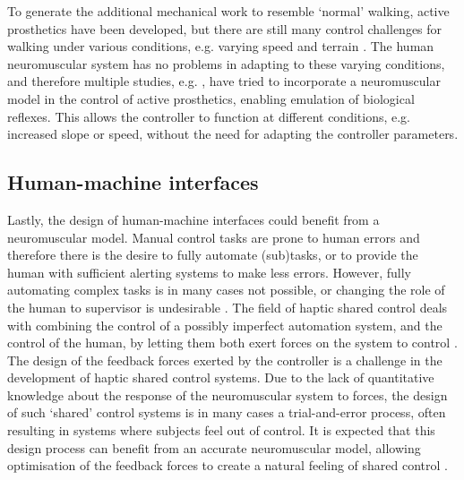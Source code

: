 To generate the additional mechanical work to resemble `normal' walking, active prosthetics have been developed, but there are still many control challenges for walking under various conditions, e.g. varying speed and terrain \cite{markowitz_speed_2011}. The human neuromuscular system has no problems in adapting to these varying conditions, and therefore multiple studies, e.g. \cite{eilenberg_control_2010, markowitz_speed_2011, eilenberg_development_2018}, have tried to incorporate a neuromuscular model in the control of active prosthetics, enabling emulation of biological reflexes. This allows the controller to function at different conditions, e.g. increased slope or speed, without the need for adapting the controller parameters. 

\subsection*{Human-machine interfaces}
Lastly, the design of human-machine interfaces could benefit from a neuromuscular model. Manual control tasks are prone to human errors and therefore there is the desire to fully automate (sub)tasks, or to provide the human with sufficient alerting systems to make less errors. However, fully automating complex tasks is in many cases not possible, or changing the role of the human to supervisor is undesirable \cite{sheridan_humans_2002}. The field of haptic shared control deals with combining the control of a possibly imperfect automation system, and the control of the human, by letting them both exert forces on the system to control \cite{hosseini_neuromuscular_2010}. The design of the feedback forces exerted by the controller is a challenge in the development of haptic shared control systems. Due to the lack of quantitative knowledge about the response of the neuromuscular system to forces, the design of such `shared' control systems is in many cases a trial-and-error process, often resulting in systems where subjects feel out of control. It is expected that this design process can benefit from an accurate neuromuscular model, allowing optimisation of the feedback forces to create a natural feeling of shared control \cite{hosseini_neuromuscular_2010}. 

